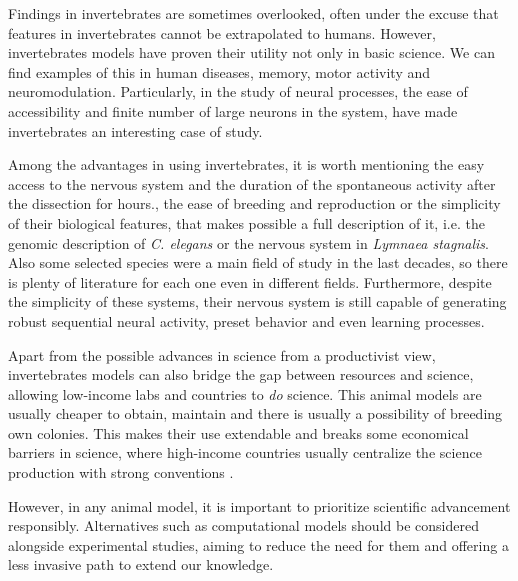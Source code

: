 Findings in invertebrates are sometimes overlooked, often under the excuse that features in invertebrates cannot be extrapolated to humans. However, invertebrates models have proven their utility not only in basic science. We can find examples of this in human diseases, memory, motor activity and neuromodulation. Particularly, in the study of neural processes, the ease of accessibility and finite number of large neurons in the system, have made invertebrates an interesting case of study. 

Among the advantages in using invertebrates, it is worth mentioning the easy access to the nervous system and the duration of the spontaneous activity after the dissection for hours., the ease of breeding and reproduction or the simplicity of their biological features, that makes possible a full description of it, i.e. the genomic description of \textit{C. elegans} or the nervous system in \textit{Lymnaea stagnalis}. Also some selected species were a main field of study in the last decades, so there is plenty of literature for each one even in different fields. Furthermore, despite the simplicity of these systems, their nervous system is still capable of generating robust sequential neural activity, preset behavior and even learning processes. 


Apart from the possible advances in science from a productivist view, invertebrates models can also bridge the gap between resources and science, allowing low-income labs and countries to \textit{do} science. This animal models are usually cheaper to obtain, maintain and there is usually a possibility of breeding own colonies. This makes their use extendable and breaks some economical barriers in science, where high-income countries usually centralize the science production with strong conventions \parencite{castillo_spineless_2017,stephan_how_2015}. 


However, in any animal model, it is important to prioritize scientific advancement responsibly. Alternatives such as computational models should be considered alongside experimental studies, aiming to reduce the need for them and offering a less invasive path to extend our knowledge.


